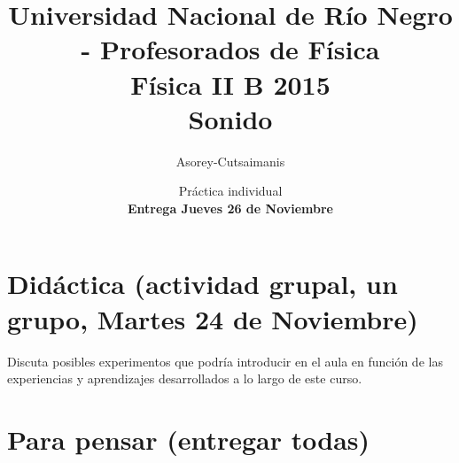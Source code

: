 \documentclass[a4paper,12pt]{article}
\begin{document}
\title{
{\normalsize{Universidad Nacional de Río Negro - Profesorados de Física}}\\
Física II B 2015\\Sonido\\}
\author{Asorey-Cutsaimanis}
\date{Práctica individual\\{\bf{Entrega Jueves 26 de Noviembre}}}
\maketitle

\section{Didáctica (actividad grupal, un grupo, Martes 24 de Noviembre)}

Discuta posibles experimentos que podría introducir en el aula en
función de las experiencias y aprendizajes desarrollados a lo largo de
este curso.

\section{Para pensar (entregar todas)}
\end{document}
